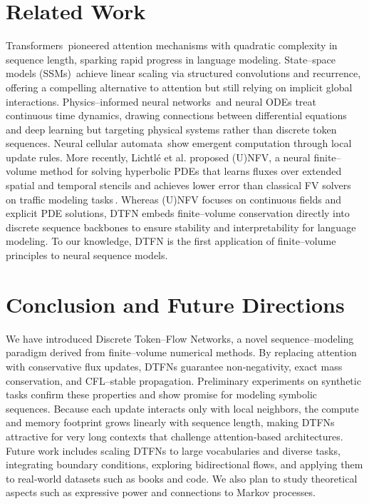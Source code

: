 \documentclass[10pt]{article}
\begin{document}
\section{Related Work}
Transformers\,\cite{vaswani2017attention} pioneered attention mechanisms with
quadratic complexity in sequence length, sparking rapid progress in language
modeling. State–space models (SSMs)\,\cite{gu2021combining,gu2022efficiently}
achieve linear scaling via structured convolutions and recurrence, offering a
compelling alternative to attention but still relying on implicit global
interactions. Physics–informed neural networks\,\cite{raissi2019physics} and
neural ODEs treat continuous time dynamics, drawing connections between
differential equations and deep learning but targeting physical systems rather
than discrete token sequences. Neural cellular automata\,\cite{mordvintsev2020growing}
show emergent computation through local update rules. More recently,
Lichtlé et al. proposed (U)NFV, a neural finite–volume method for solving
hyperbolic PDEs that learns fluxes over extended spatial and temporal
 stencils and achieves lower error than classical FV solvers on traffic
 modeling tasks\,\cite{lichtle2025unfv}. Whereas (U)NFV focuses on continuous
fields and explicit PDE solutions, DTFN embeds finite–volume conservation
directly into discrete sequence backbones to ensure stability and
interpretability for language modeling. To our knowledge, DTFN is the first
application of finite–volume principles to neural sequence models.

\section{Conclusion and Future Directions}
We have introduced Discrete Token–Flow Networks, a novel sequence–modeling
paradigm derived from finite–volume numerical methods. By replacing attention
with conservative flux updates, DTFNs guarantee non‑negativity, exact mass
conservation, and CFL–stable propagation. Preliminary experiments on synthetic
tasks confirm these properties and show promise for modeling symbolic
sequences. Because each update interacts only with local neighbors, the
compute and memory footprint grows linearly with sequence length, making
DTFNs attractive for very long contexts that challenge attention‑based
architectures. Future work includes scaling DTFNs to large vocabularies
and diverse tasks, integrating boundary conditions, exploring bidirectional
flows, and applying them to real‑world datasets such as books and code.
We also plan to study theoretical aspects such as expressive power and
connections to Markov processes.
\end{document}
